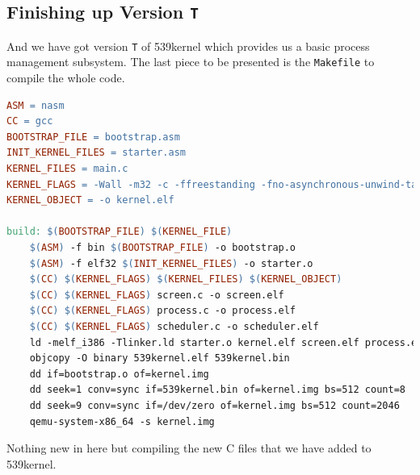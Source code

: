 \subsection{\texorpdfstring{Finishing up Version
\texttt{T}}{Finishing up Version T}}\label{finishing-up-version-t}

And we have got version \lstinline!T! of 539kernel which provides us a
basic process management subsystem. The last piece to be presented is
the \lstinline!Makefile! to compile the whole code.

\begin{lstlisting}[language=make]
ASM = nasm
CC = gcc
BOOTSTRAP_FILE = bootstrap.asm 
INIT_KERNEL_FILES = starter.asm
KERNEL_FILES = main.c
KERNEL_FLAGS = -Wall -m32 -c -ffreestanding -fno-asynchronous-unwind-tables -fno-pie
KERNEL_OBJECT = -o kernel.elf

build: $(BOOTSTRAP_FILE) $(KERNEL_FILE)
    $(ASM) -f bin $(BOOTSTRAP_FILE) -o bootstrap.o
    $(ASM) -f elf32 $(INIT_KERNEL_FILES) -o starter.o 
    $(CC) $(KERNEL_FLAGS) $(KERNEL_FILES) $(KERNEL_OBJECT)
    $(CC) $(KERNEL_FLAGS) screen.c -o screen.elf
    $(CC) $(KERNEL_FLAGS) process.c -o process.elf
    $(CC) $(KERNEL_FLAGS) scheduler.c -o scheduler.elf
    ld -melf_i386 -Tlinker.ld starter.o kernel.elf screen.elf process.elf scheduler.elf -o 539kernel.elf
    objcopy -O binary 539kernel.elf 539kernel.bin
    dd if=bootstrap.o of=kernel.img
    dd seek=1 conv=sync if=539kernel.bin of=kernel.img bs=512 count=8
    dd seek=9 conv=sync if=/dev/zero of=kernel.img bs=512 count=2046
    qemu-system-x86_64 -s kernel.img
\end{lstlisting}

Nothing new in here but compiling the new C files that we have added to
539kernel.
